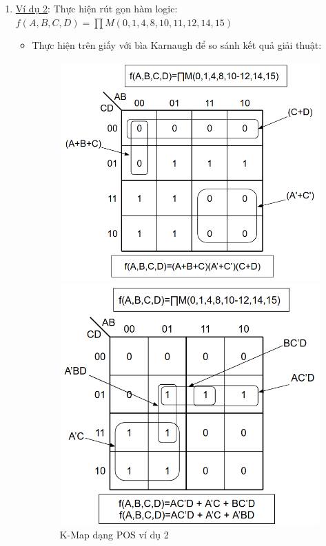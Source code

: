 \documentclass[titlepage]{article} %
\begin{document}
\begin{enumerate}
    
    \item \underline{Ví dụ 2}: Thực hiện rút gọn hàm logic: \\   
    $f(A,B,C,D) = \prod M(0,1,4,8,10,11,12,14,15)$
    \begin{itemize} 
        \item Thực hiện trên giấy với bìa Karnaugh \cite{KMap:2020} để so sánh kết quả giải thuật:
        \begin{figure}[!h]
        \begin{minipage}[t]{0.5\linewidth}
            \centering
            \includegraphics[width=.9\textwidth]{kmap_maxtern_2.png}
            \caption[K-Map dạng POS ví dụ 2]{\centering K-Map dạng POS ví dụ 2}
            \label{img:kmap_maxtern_2}
        \end{minipage}
        \hspace{0.1cm}
        \begin{minipage}[t]{0.5\linewidth} 
            \centering
            \includegraphics[width=.9\textwidth]{kmap_mintern_2.png}

\end{minipage}
\end{figure}
\end{itemize}
\end{enumerate}
\end{document}
